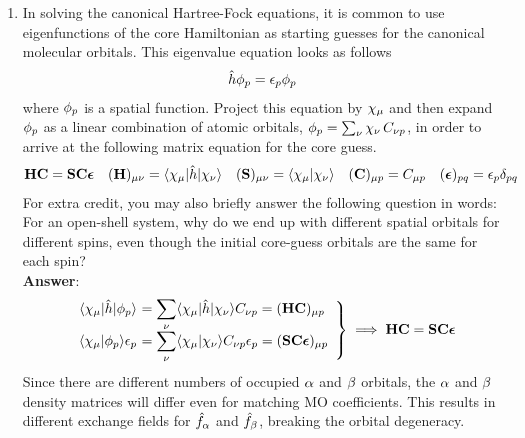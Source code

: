\documentclass[11pt]{article}
\numberwithin{equation}{section}
\begin{document}
\begin{enumerate}
\item
  In solving the canonical Hartree-Fock equations, it is common to use eigenfunctions of the core Hamiltonian as starting guesses for the canonical molecular orbitals.
  This eigenvalue equation looks as follows
  \begin{align*}
    \hat{h}
    \phi _{p}
  =
    \epsilon _{p}
    \phi _{p}
  \end{align*}
  where $\phi _p$ is a spatial function.
  Project this equation by $\x_\mu$ and then expand $\phi _p$ as a linear combination of atomic orbitals, $\f_p=\sum_\nu \x_\nu\, C_{\nu p}$, in order to arrive at the following matrix equation for the core guess.
  \begin{align*}
    \bo{H}\bo{C}
  =
    \bo{S}\bo{C}\bm{\ev}
  &&
    (\bo{H})_{\mu\nu}
  =
    \ip{\x_\mu|\op{h}|\x_\nu}
  &&
    (\bo{S})_{\mu\nu}
  =
    \ip{\x_\mu|\x_\nu}
  &&
    (\bo{C})_{\mu p}
  =
    C_{\mu p}
  &&
    (\bm{\ev})_{pq}
  =
    \ev_p\d_{pq}
  \end{align*}
  For extra credit, you may also briefly answer the following question in words: For an open-shell system, why do we end up with different spatial orbitals for different spins, even though the initial core-guess orbitals are the same for each spin?\\[1cm]
  \textbf{Answer}:
  \begin{align*}
  \left.
  \begin{array}{r@{\ }l}
    \ip{\x_\mu|\op{h}|\f_p}
  &=
  \ds{
    \sum_\nu
    \ip{\x_\mu|\op{h}|\x_\nu}
    C_{\nu p}
  }
  =
    (\bo{H}\bo{C})_{\mu p}
  \\
    \ip{\x_\mu|\f_p}
    \ev_p
  &=
  \ds{
    \sum_\nu
    \ip{\x_\mu|\x_\nu}
    C_{\nu p}
    \ev_p
  }
  =
    (\bo{S}\bo{C}\bm{\ev})_{\mu p}
  \end{array}
  \right\}
  \implies
    \bo{H}\bo{C}
  =
    \bo{S}\bo{C}\bm{\ev}
  \end{align*}
  Since there are different numbers of occupied $\alpha $ and $\beta $ orbitals, the $\alpha $ and $\beta $ density matrices will differ even for matching MO coefficients.
  This results in different exchange fields for $\hat{f}_{\alpha }$ and $\hat{f}_{\beta }$, breaking the orbital degeneracy.



\end{enumerate}
\end{document}
